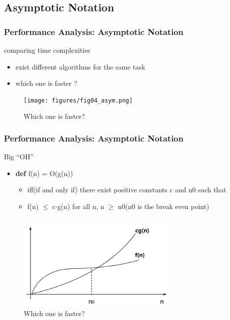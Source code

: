 \documentclass[newPxFont,sthlmFooter,nooffset]{beamer}
\begin{document}
\subsection{Asymptotic Notation}
\begin{frame}[t]
  \frametitle{Performance Analysis: Asymptotic Notation}
comparing time complexities
\begin{itemize}
\item exist different algorithms for the same task
\item which one is faster ?
\end{itemize}
  \begin{figure}[h]
    \centering
    \texttt{[image: figures/fig04\_asym.png]}
    \caption{Which one is faster?}
  \end{figure}
\end{frame}

\begin{frame}[t]
  \frametitle{Performance Analysis: Asymptotic Notation}
Big ``OH''
\begin{itemize}
\item \textbf{def} f(n) = O(g(n))
  \begin{itemize}
  \item iff(if and only if) there exist positive constants c and n0 such that
  \item f(n) $\leq$ c$\cdot$g(n) for all n, n $\geq$ n0(n0 is the break even point)
  \end{itemize}
\end{itemize}
  \begin{figure}[h]
    \centering
    \includegraphics[width=0.7\textwidth]{figures/fig05_bigoh.png}
    \caption{Which one is faster?}
  \end{figure}
\end{frame}
\end{document}
